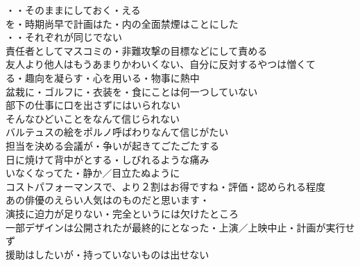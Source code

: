 ・・そのままにしておく・える　　\\
を・時期尚早で計画はた・内の全面禁煙はことにした\\

・・それぞれが同じでない\\
責任者としてマスコミの・非難攻撃の目標などにして責める\\
友人より他人はもうあまりかわいくない、自分に反対するやつは憎くて\\

る・趣向を凝らす・心を用いる・物事に熱中\\
盆栽に・ゴルフに・衣装を・食にことは何一つしていない\\

部下の仕事に口を出さずにはいられない\\
そんなひどいことをなんて信じられない\\
バルテュスの絵をポルノ呼ばわりなんて信じがたい\\

担当を決める会議が・争いが起きてごたごたする\\
日に焼けて背中がとする・しびれるような痛み\\
いなくなってた・静か／目立たぬように\\

コストパフォーマンスで、より２割はお得ですね・評価・認められる程度\\
あの俳優のえらい人気はのものだと思います・\\
演技に迫力が足りない・完全というには欠けたところ\\
一部デザインは公開されたが最終的にとなった・上演／上映中止・計画が実行せず\\
援助はしたいが・持っていないものは出せない\\

